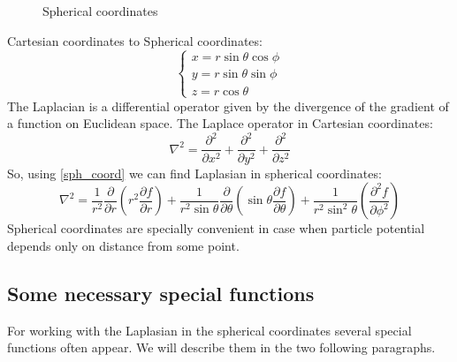 \documentclass[a4paper, 14pt]{article}
\begin{document}
%
%
\begin{figure}[h!]
\begin{center}
\end{center}
\caption{Spherical coordinates}
\end{figure}
Cartesian coordinates to Spherical coordinates:
\begin{equation} \label{sph_coord}
\begin{cases}
	{x}= {r} \sin{\theta}\cos{\phi} \\
	{y} = {r} \sin{\theta}\sin{\phi} \\
	{z} = {r}\cos{\theta}
\end{cases}
\end{equation}
The Laplacian is a differential operator given by the divergence of the gradient of a function on Euclidean space.  The Laplace operator in Cartesian coordinates:
 	$$\nabla^2= \frac{\partial^2}{\partial x^2}  + \frac{\partial^2}{\partial y^2} + \frac{\partial^2}{\partial z^2}$$
So, using \eqref{sph_coord} we can find Laplasian in spherical coordinates:
\begin{equation}\label{sph_lap}
	\nabla^2 = \frac{1}{r^2} \frac{\partial}{\partial r}({r^2}\frac{\partial f}{\partial r})+\frac{1}{r^2\sin{\theta}}\frac{\partial}{\partial \theta}(\sin{\theta}\frac{\partial f}{\partial \theta})+\frac{1}{r^2\sin^2{\theta}}(\frac{\partial^2 f}{\partial \phi^2})
\end{equation}
Spherical coordinates are specially convenient in case when particle potential depends only on distance from some point.


\subsection{Some  necessary special functions}
For working with the Laplasian in the spherical coordinates several special functions often appear. We will describe them in the two following paragraphs.
\end{document}
